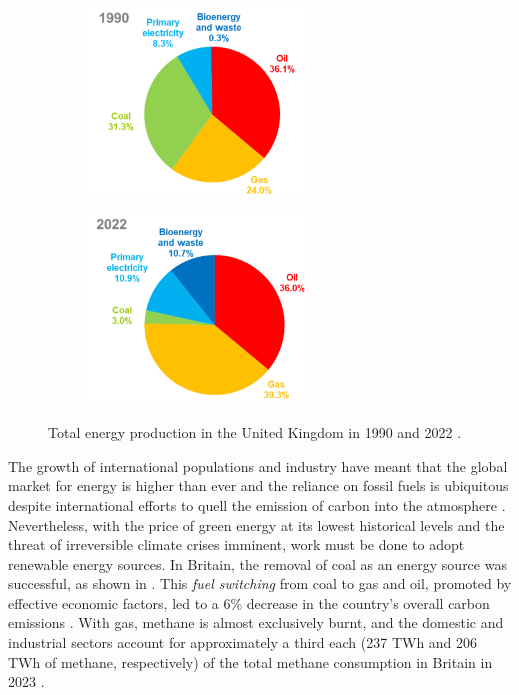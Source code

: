 \begin{figure}[t]
\centering
    \begin{subfigure}{0.40\textwidth}
    \centering
    \includegraphics[height=5cm]{assets/graphs/energy-consumption_1990.png}
    \end{subfigure}
    \begin{subfigure}{0.40\textwidth}
    \centering
    \includegraphics[height=5cm]{assets/graphs/energy-consumption_2022.png}
    \end{subfigure}
\caption{Total energy production in the United Kingdom in 1990 and 2022 \cite{departmentforenergysecurityandnetzero2023UKEnergyBrief}.}
\label{fig:fuel-consump}
\end{figure}

The growth of international populations and industry have meant that the global market for energy is higher than ever \cite{newell2019GlobalEnergyOutlook} and the reliance on fossil fuels is ubiquitous despite international efforts to quell the emission of carbon into the atmosphere \cite{unitednations2015ParisAgreementUNFCCC}. Nevertheless, with the price of green energy at its lowest historical levels \cite{internationalrenewableenergyagency2022RenewablePowerGeneration} and the threat of irreversible climate crises imminent, work must be done to adopt renewable energy sources. In Britain, the removal of coal as an energy source was successful, as shown in . This \emph{fuel switching} from coal to gas and oil, promoted by effective economic factors, led to a 6\% decrease in the country's overall carbon emissions \cite{wilson2018RapidFuelSwitching}. With gas, methane is almost exclusively burnt, and the domestic and industrial sectors account for approximately a third each (237 TWh and 206 TWh of methane, respectively) of the total methane consumption in Britain in 2023 \cite{departmentforenergysecurityandnetzero2023HistoricalGasData}.

